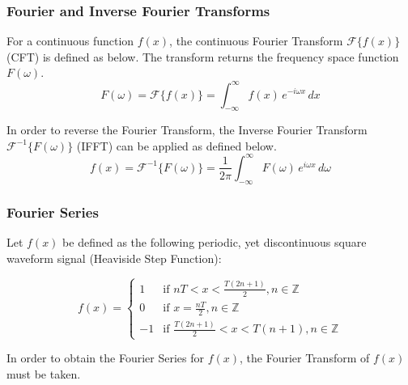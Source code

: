 \subsubsection{Fourier and Inverse Fourier Transforms}
\begin{definition}
    For a continuous function $f(x)$, the continuous Fourier Transform $\mathcal{F}\{ f(x) \}$ (CFT) is defined as below. The transform returns the frequency space function $F(\omega)$.
    \begin{equation}
        F(\omega) = \mathcal{F}\{ f(x) \} = \int_{-\infty}^{\infty} f(x)  \, e^{-i \omega x} \,dx
    \end{equation}
\end{definition}


\begin{definition}
    In order to reverse the Fourier Transform, the Inverse Fourier Transform $\mathcal{F}^{-1}\{ F(\omega) \}$ (IFFT) can be applied as defined below.
    \begin{equation} \label{eq:heaviside_step}
        f(x) = \mathcal{F}^{-1}\{ F(\omega) \} = \frac{1}{2\pi} \int_{-\infty}^{\infty} F(\omega) \, e^{i \omega x} \,d \omega
    \end{equation}
\end{definition}

\subsubsection{Fourier Series}
Let \(f(x)\) be defined as the following periodic, yet discontinuous square waveform signal (Heaviside Step Function):

\begin{equation}
f(x)=
    \begin{cases}
        1 & \text{if } nT < x < \frac{T(2n+1)}{2} , n \in \mathbb{Z}\\
        0 & \text{if } x = \frac{nT}{2} , n \in \mathbb{Z}\\
        -1 & \text{if } \frac{T(2n+1)}{2} < x < T(n+1) , n \in \mathbb{Z}
    \end{cases}
\end{equation}

In order to obtain the Fourier Series for \(f(x)\), the Fourier Transform of \(f(x)\) must be taken.

